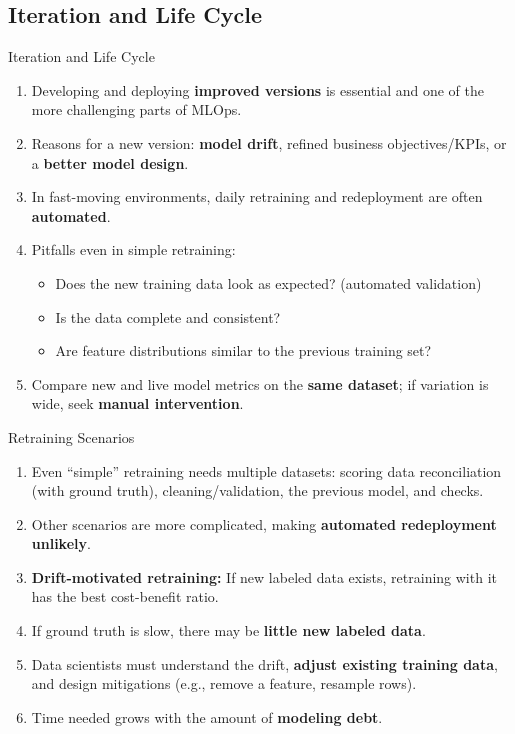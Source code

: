 \subsection{Iteration and Life Cycle}

\begin{frame}{Iteration and Life Cycle}
\begin{enumerate}
\item<1-> Developing and deploying \textbf{improved versions} is essential and one of the more challenging parts of MLOps.
\item<2-> Reasons for a new version: \textbf{model drift}, refined business objectives/KPIs, or a \textbf{better model design}.
\item<3-> In fast-moving environments, daily retraining and redeployment are often \textbf{automated}.
\item<4-> Pitfalls even in simple retraining:
    \begin{itemize}
    \item Does the new training data look as expected? (automated validation)
    \item Is the data complete and consistent?
    \item Are feature distributions similar to the previous training set?
    \end{itemize}
\item<5-> Compare new and live model metrics on the \textbf{same dataset}; if variation is wide, seek \textbf{manual intervention}.
\end{enumerate}
\end{frame}

\begin{frame}{Retraining Scenarios}
\begin{enumerate}
\item<1-> Even ``simple'' retraining needs multiple datasets: scoring data reconciliation (with ground truth), cleaning/validation, the previous model, and checks.
\item<2-> Other scenarios are more complicated, making \textbf{automated redeployment unlikely}.
\item<3-> \textbf{Drift-motivated retraining:} If new labeled data exists, retraining with it has the best cost-benefit ratio.
\item<4-> If ground truth is slow, there may be \textbf{little new labeled data}.
\item<5-> Data scientists must understand the drift, \textbf{adjust existing training data}, and design mitigations (e.g., remove a feature, resample rows).
\item<6-> Time needed grows with the amount of \textbf{modeling debt}.
\end{enumerate}
\end{frame}

